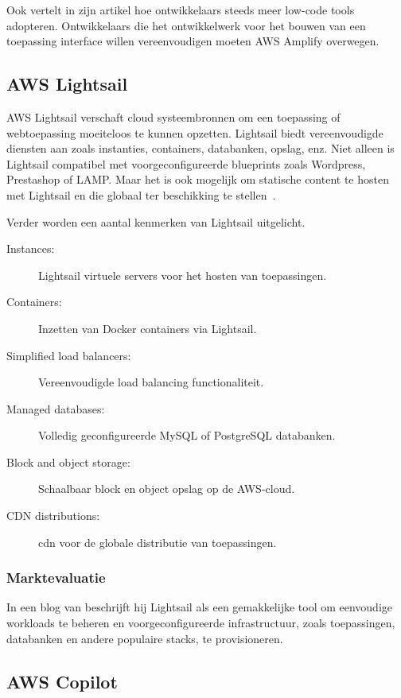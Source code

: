 Ook \textcite{Nwamba2022} vertelt in zijn artikel hoe ontwikkelaars steeds meer low-code tools adopteren.
Ontwikkelaars die het ontwikkelwerk voor het bouwen van een toepassing interface willen vereenvoudigen moeten AWS Amplify overwegen.

\subsection{AWS Lightsail}
\label{subsec:service-lightsail}

AWS Lightsail verschaft cloud systeembronnen om een toepassing of webtoepassing moeiteloos te kunnen opzetten.
Lightsail biedt vereenvoudigde diensten aan zoals instanties, containers, databanken, opslag, enz.
Niet alleen is Lightsail compatibel met voorgeconfigureerde blueprints zoals Wordpress, Prestashop of LAMP\@.
Maar het is ook mogelijk om statische content te hosten met Lightsail en die globaal ter beschikking te stellen~\autocite{AWSLightsail2022}.

Verder worden een aantal kenmerken van Lightsail uitgelicht.

\begin{description}
    \item[Instances: ] Lightsail virtuele servers voor het hosten van toepassingen.
    \item[Containers: ] Inzetten van Docker containers via Lightsail.
    \item[Simplified load balancers: ] Vereenvoudigde load balancing functionaliteit.
    \item[Managed databases: ] Volledig geconfigureerde MySQL of PostgreSQL databanken.
    \item[Block and object storage: ] Schaalbaar block en object opslag op de AWS-cloud.
    \item[CDN distributions: ] \acrfull{cdn} voor de globale distributie van toepassingen.
\end{description}

\subsubsection{Marktevaluatie}

In een blog van \textcite{Warrier2022} beschrijft hij Lightsail als een gemakkelijke tool om eenvoudige workloads te beheren
en voorgeconfigureerde infrastructuur, zoals toepassingen, databanken en andere populaire stacks, te provisioneren.

\subsection{AWS Copilot}
\label{subsec:service-copilot}

